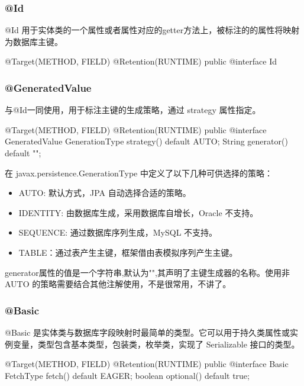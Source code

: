 \subsubsection{@Id}

@Id 用于实体类的一个属性或者属性对应的getter方法上，被标注的的属性将映射为数据库主键。

\begin{Java}
@Target({METHOD, FIELD})
@Retention(RUNTIME)
public @interface Id {}
\end{Java}

\subsubsection{@GeneratedValue}

与@Id一同使用，用于标注主键的生成策略，通过 strategy 属性指定。

\begin{Java}
@Target({METHOD, FIELD})
@Retention(RUNTIME)
public @interface GeneratedValue {
    GenerationType strategy() default AUTO;
    String generator() default "";
}
\end{Java}

在 javax.persistence.GenerationType 中定义了以下几种可供选择的策略：
\begin{itemize}
    \item AUTO: 默认方式，JPA 自动选择合适的策略。
    \item IDENTITY: 由数据库生成，采用数据库自增长，Oracle 不支持。
    \item SEQUENCE: 通过数据库序列生成，MySQL 不支持。
    \item TABLE：通过表产生主键，框架借由表模拟序列产生主键。
\end{itemize}

generator属性的值是一个字符串,默认为"",其声明了主键生成器的名称。使用非 AUTO 的策略需要结合其他注解使用，不是很常用，不讲了。

\subsubsection{@Basic}

@Basic 是实体类与数据库字段映射时最简单的类型。它可以用于持久类属性或实例变量，类型包含基本类型，包装类，枚举类，实现了 Serializable 接口的类型。

\begin{Java}
@Target({METHOD, FIELD}) 
@Retention(RUNTIME)
public @interface Basic {
    FetchType fetch() default EAGER;
    boolean optional() default true;
}
\end{Java}

